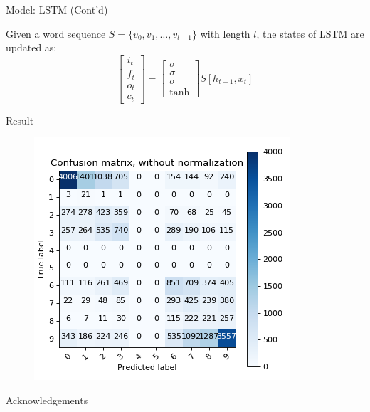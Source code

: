 \documentclass[final]{beamer}
\newlength{\onecolwid}
\begin{document}
\begin{frame}[t]
\begin{columns}[t]
\begin{column}{\onecolwid}

\begin{block}{Model: LSTM (Cont'd)}

Given a word sequence $S=\{v_0,v_1,\ldots,v_{l-1}\}$ with length $l$, the states
of LSTM are updated as:
$$
\begin{bmatrix}
i_t\\f_t\\o_t\\c_t
\end{bmatrix} =
\begin{bmatrix}
\sigma\\\sigma\\\sigma\\\tanh
\end{bmatrix}
S[h_{t-1},x_t]
$$
\end{block}


\begin{block}{Result}

\begin{figure}
\includegraphics[width=0.8\linewidth]{figure/conf_matrix}
\end{figure}

\end{block}


\begin{block}{Acknowledgements}


\end{block}
\end{column}
\end{columns}
\end{frame}
\end{document}
